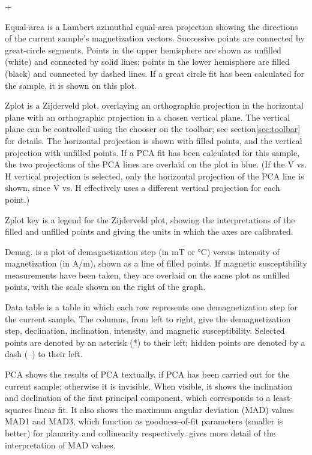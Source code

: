 \documentclass[a4paper,british]{article}
\newcommand{\menuitemlabel}[1]{%
\mbox{\textsf{#1}}\hfil}
\newenvironment{menuitemlist}%
{\begin{list}{}{%
\renewcommand{\makelabel}{\menuitemlabel}%
\setlength{\labelwidth}{35pt}%
\setlength{\leftmargin}%
             {\labelwidth+\labelsep}}}%
{\end{list}}
\newcommand{\ppcmd}[1]{\textsf{#1}} %
\newcommand{\caps}[1]{\MakeTextUppercase{#1}} %
\begin{document}
\begin{menuitemlist}

\item[Equal-area] is a Lambert azimuthal equal-area projection showing
the directions of the current sample's magnetization vectors. Successive
points are connected by great-circle segments. Points in the upper hemisphere
are shown as unfilled (white) and connected by solid lines; points in the
lower hemisphere are filled (black) and connected by dashed lines. If a great
circle fit has been calculated for the sample, it is shown on this plot.

\item[Zplot] is a Zijderveld plot, overlaying an orthographic projection in
  the horizontal plane with an orthographic projection in a chosen vertical
  plane. The vertical plane can be controlled using the chooser on the
  toolbar; see section\ref{sec:toolbar} for details. The horizontal
  projection is shown with filled points, and the vertical projection with
  unfilled points. If a \caps{pca} fit has been calculated for this sample,
  the two projections of the \caps{pca} lines are overlaid on the plot in
  blue. (If the \ppcmd{V vs. H} vertical projection is selected, only the
  horizontal projection of the \caps{pca} line is shown, since \ppcmd{V vs.
    H} effectively uses a different vertical projection for each point.)

\item[Zplot key] is a legend for the Zijderveld plot, showing
the interpretations of the filled and unfilled points and giving the
units in which the axes are calibrated.

\item[Demag.] is a plot of demagnetization step (in mT or °C) versus
intensity of magnetization (in A/m), shown as a line of filled points.
If magnetic susceptibility measurements have been taken, they are
overlaid on the same plot as unfilled points, with the scale shown on the
right of the graph.

\item[Data table] is a table in which each row represents one
demagnetization step for the current sample. The columns, from left
to right, give the demagnetization step, declination, inclination,
intensity, and magnetic susceptibility. Selected points are denoted
by an asterisk (*) to their left; hidden points are denoted by a
dash (--) to their left.

\item[\caps{Pca}] shows the results of \caps{pca} textually, if
\caps{pca} has been carried out for the current sample; otherwise it is
invisible. When visible, it shows the inclination and declination of the
first principal component, which corresponds to a least-squares linear
fit. It also shows the maximum angular deviation (\caps{mad}) values
\caps{mad}1 and \caps{mad}3, which function as goodness-of-fit parameters
(smaller is better) for planarity and collinearity respectively.
\cite{kirschvink1980least} gives more detail of the interpretation
of \caps{mad} values.


\end{menuitemlist}
\end{document}
